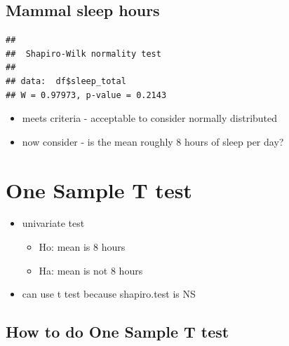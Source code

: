 \documentclass[
]{book}
\newenvironment{Shaded}{\begin{snugshade}}{\end{snugshade}}
\newcommand{\DataTypeTok}[1]{\textcolor[rgb]{0.13,0.29,0.53}{#1}}
\newcommand{\DecValTok}[1]{\textcolor[rgb]{0.00,0.00,0.81}{#1}}
\newcommand{\KeywordTok}[1]{\textcolor[rgb]{0.13,0.29,0.53}{\textbf{#1}}}
\newcommand{\NormalTok}[1]{#1}
\newcommand{\OperatorTok}[1]{\textcolor[rgb]{0.81,0.36,0.00}{\textbf{#1}}}
\newcommand{\StringTok}[1]{\textcolor[rgb]{0.31,0.60,0.02}{#1}}
\providecommand{\tightlist}{%
  \setlength{\itemsep}{0pt}\setlength{\parskip}{0pt}}
\begin{document}
\hypertarget{mammal-sleep-hours}{%
\subsection{Mammal sleep hours}\label{mammal-sleep-hours}}

\begin{Shaded}
\end{Shaded}

\begin{verbatim}
## 
##  Shapiro-Wilk normality test
## 
## data:  df$sleep_total
## W = 0.97973, p-value = 0.2143
\end{verbatim}

\begin{itemize}
\tightlist
\item
  meets criteria - acceptable to consider normally distributed
\item
  now consider - is the mean roughly 8 hours of sleep per day?
\end{itemize}

\hypertarget{one-sample-t-test}{%
\section{One Sample T test}\label{one-sample-t-test}}

\begin{itemize}
\tightlist
\item
  univariate test

  \begin{itemize}
  \tightlist
  \item
    Ho: mean is 8 hours
  \item
    Ha: mean is not 8 hours
  \end{itemize}
\item
  can use t test because shapiro.test is NS
\end{itemize}

\hypertarget{how-to-do-one-sample-t-test}{%
\subsection{How to do One Sample T test}\label{how-to-do-one-sample-t-test}}

\begin{Shaded}
\end{Shaded}
\end{document}
